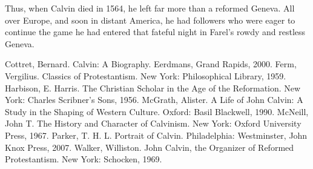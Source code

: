 Thus, when Calvin died in 1564, he left far more than a reformed Geneva. All over Europe, and soon
in distant America, he had followers who were eager to continue the game he had entered that fateful
night in Farel’s rowdy and restless Geneva.

\begin{readinglist}
\entry *Cottret, Bernard. Calvin: A Biography. Eerdmans, Grand Rapids, 2000.
\entry Ferm, Vergilius. Classics of Protestantism. New York: Philosophical Library, 1959.
\entry Harbison, E. Harris. The Christian Scholar in the Age of the Reformation. New York: Charles
  Scribner’s Sons, 1956.
\entry McGrath, Alister. A Life of John Calvin: A Study in the Shaping of Western Culture. Oxford:
  Basil Blackwell, 1990.
\entry McNeill, John T. The History and Character of Calvinism. New York: Oxford University Press,
  1967.
\entry Parker, T. H. L. Portrait of Calvin. Philadelphia: Westminster, John Knox Press, 2007.
\entry Walker, Williston. John Calvin, the Organizer of Reformed Protestantism. New York: Schocken,
  1969.
\end{readinglist}
